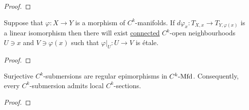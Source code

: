             \begin{proof}
                
            \end{proof}
        \begin{theorem} \label{theorem: inverse_function_theorem}
            Suppose that $\varphi: X \to Y$ is a morphism of $C^k$-manifolds. If $d\varphi_x: T_{X, x} \to T_{Y, \varphi(x)}$ is a linear isomorphism then there will exist \underline{connected} $C^k$-open neighbourhoods $U \ni x$ and $V \ni \varphi(x)$ such that $\varphi|_U: U \to V$ is \'etale.
        \end{theorem}
            \begin{proof}
                
            \end{proof}

        \begin{lemma} \label{lemma: regular_epimorphisms_of_differentiable_manifolds}
            Surjective $C^k$-submersions are regular epimorphisms in $C^k\text{-}\mathrm{Mfd}$. Consequently, every $C^k$-submersion admits local $C^k$-sections.
        \end{lemma}
            \begin{proof}
                
            \end{proof}

